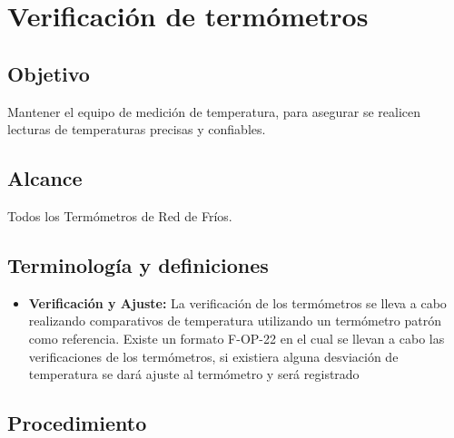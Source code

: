 \thispagestyle{formato-PI}
\renewcommand{\MayorVer}{2}
\renewcommand{\MenorVer}{0}
\renewcommand{\Titulo}{Verificación de termómetros}
\renewcommand{\TipoID}{PRO}
\renewcommand{\FechaPub}{2023--01}

\section{\Titulo}
\renewcommand{\Codigo}{\Prog--\thesection--\TipoID}

\subsection{Objetivo}

Mantener el equipo de medición de temperatura, para asegurar se realicen lecturas de temperaturas precisas y confiables.

\subsection{Alcance}

Todos los Termómetros de Red de Fríos.

\subsection{Terminología y definiciones}

\begin{itemize}
	\item \textbf{Verificación y Ajuste:} La verificación de los termómetros se lleva a cabo realizando comparativos de temperatura utilizando un termómetro patrón como referencia. Existe un formato F-OP-22 en el cual se llevan a cabo las verificaciones de los termómetros, si existiera alguna desviación de temperatura se dará ajuste al termómetro y será registrado %
\end{itemize}

\subsection{Procedimiento}

